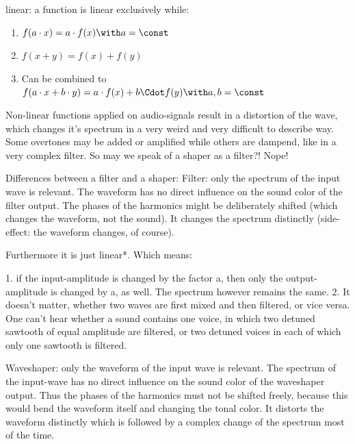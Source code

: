 linear: a function is linear exclusively while: 
\begin{enumerate}
	\item $f(a\cdot x) = a \cdot f(x) \with a=\const$
	\item $f(x+y) = f(x)+f(y)$
	\item Can be combined to $f(a\cdot x+b \cdot y)=a \cdot f(x)+b \Cdot f(y) \with a,b=\const$
\end{enumerate}
Non-linear functions applied on audio-signals result in a distortion of the wave, which changes it's spectrum in a very weird and very difficult to describe way. Some overtones may be added or amplified while others are dampend, like in a very complex filter. So may we speak of a shaper as a filter?! Nope!

Differences between a filter and a shaper:
Filter: only the spectrum of the input wave is relevant. The waveform has no direct influence on the sound color of the filter output. The phases of the harmonics might be deliberately shifted (which changes the waveform, not the sound). It changes the spectrum distinctly (side-effect: the waveform changes, of course).

Furthermore it is just linear*. Which means:

1. if the input-amplitude is changed by the factor a, then only the output-amplitude is changed by a, as well. The spectrum however remains the same.
2. It doesn't matter, whether two waves are first mixed and then filtered, or vice versa. One can't hear whether a sound contains one voice, in which two detuned sawtooth of equal amplitude are filtered, or two detuned voices in each of which only one sawtooth is filtered.

Waveshaper: only the waveform of the input wave is relevant. The spectrum of the input-wave has no direct influence on the sound color of the waveshaper output. Thus the phases of the harmonics must not be shifted freely, because this would bend the waveform itself and changing the tonal color. It distorts the waveform distinctly which is followed by a complex change of the spectrum most of the time.

